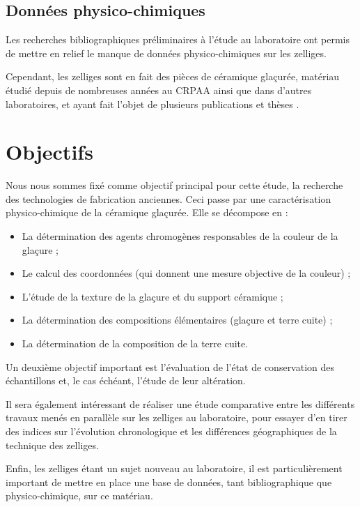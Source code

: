 \section{Données physico-chimiques}

Les recherches bibliographiques préliminaires à l'étude au laboratoire 
ont permis de mettre en relief le manque de données physico-chimiques 
sur les zelliges.

Cependant, les zelliges sont en fait des pièces de céramique glaçurée, 
matériau étudié depuis de nombreuses années au CRPAA ainsi que dans 
d'autres laboratoires, et ayant fait l'objet de plusieurs publications 
\autocites{Delvert_1991}{Schvoerer_1994} et thèses 
\autocite{Rafaillac_1994}.

\chapter{Objectifs}

Nous nous sommes fixé comme objectif principal pour cette étude, la 
recherche des technologies de fabrication anciennes. Ceci passe par 
une caractérisation physico-chimique de la céramique glaçurée. Elle 
se décompose en :

\begin{itemize}
  \item La détermination des agents chromogènes responsables de la 
        couleur de la glaçure ;
  \item Le calcul des coordonnées \trichros (qui donnent une mesure 
        objective de la couleur) ;
  \item L'étude de la texture de la glaçure et du support céramique ;
  \item La détermination des compositions élémentaires (glaçure et 
        terre cuite) ;
  \item La détermination de la composition \cristallo de la terre 
        cuite.
\end{itemize}

Un deuxième objectif important est l'évaluation de l'état de 
conservation des échantillons et, le cas échéant, l'étude de leur 
altération.

Il sera également intéressant de réaliser une étude comparative 
entre les différents travaux menés en parallèle sur les zelliges au 
laboratoire, pour essayer d'en tirer des indices sur l'évolution 
chronologique et les différences géographiques de la technique des 
zelliges.

Enfin, les zelliges étant un sujet nouveau au laboratoire, il est 
particulièrement important de mettre en place une base de données, 
tant bibliographique que physico-chimique, sur ce matériau.
